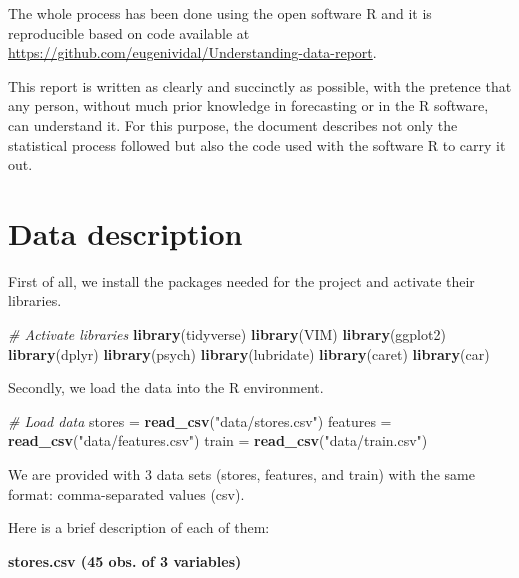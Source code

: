 \documentclass[11pt,]{article}
\newenvironment{Shaded}{\begin{snugshade}}{\end{snugshade}}
\newcommand{\KeywordTok}[1]{\textcolor[rgb]{0.13,0.29,0.53}{\textbf{{#1}}}}
\newcommand{\StringTok}[1]{\textcolor[rgb]{0.31,0.60,0.02}{{#1}}}
\newcommand{\CommentTok}[1]{\textcolor[rgb]{0.56,0.35,0.01}{\textit{{#1}}}}
\newcommand{\NormalTok}[1]{{#1}}
\begin{document}
The whole process has been done using the open software R and it is
reproducible based on code available at
\url{https://github.com/eugenividal/Understanding-data-report}.

This report is written as clearly and succinctly as possible, with the
pretence that any person, without much prior knowledge in forecasting or
in the R software, can understand it. For this purpose, the document
describes not only the statistical process followed but also the code
used with the software R to carry it out.

\section{Data description}\label{data-description}

First of all, we install the packages needed for the project and
activate their libraries.

\begin{Shaded}
\begin{Highlighting}[]
\CommentTok{# Activate libraries}
\KeywordTok{library}\NormalTok{(tidyverse)}
\KeywordTok{library}\NormalTok{(VIM)}
\KeywordTok{library}\NormalTok{(ggplot2)}
\KeywordTok{library}\NormalTok{(dplyr)}
\KeywordTok{library}\NormalTok{(psych)}
\KeywordTok{library}\NormalTok{(lubridate)}
\KeywordTok{library}\NormalTok{(caret)}
\KeywordTok{library}\NormalTok{(car)}
\end{Highlighting}
\end{Shaded}

Secondly, we load the data into the R environment.

\begin{Shaded}
\begin{Highlighting}[]
\CommentTok{# Load data}
\NormalTok{stores =}\StringTok{ }\KeywordTok{read_csv}\NormalTok{(}\StringTok{"data/stores.csv"}\NormalTok{)}
\NormalTok{features =}\StringTok{ }\KeywordTok{read_csv}\NormalTok{(}\StringTok{"data/features.csv"}\NormalTok{)}
\NormalTok{train =}\StringTok{ }\KeywordTok{read_csv}\NormalTok{(}\StringTok{"data/train.csv"}\NormalTok{)}
\end{Highlighting}
\end{Shaded}

We are provided with 3 data sets (stores, features, and train) with the
same format: comma-separated values (csv).

Here is a brief description of each of them:

\textbf{stores.csv (45 obs. of 3 variables)}
\end{document}
